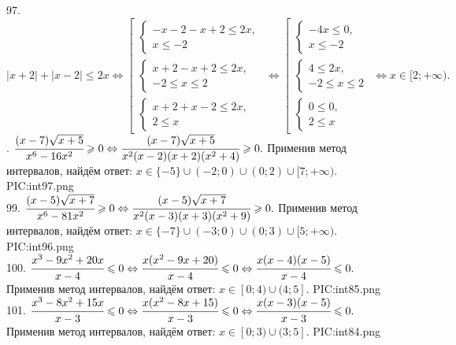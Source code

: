 97. $|x+2|+|x-2|\leqslant2x\Leftrightarrow\left[\begin{array}{l}\begin{cases}-x-2-x+2\leqslant2x,\\ x\leqslant-2\end{cases}\\
\begin{cases}x+2-x+2\leqslant2x,\\ -2\leqslant x \leqslant 2\end{cases}\\
\begin{cases}x+2+x-2\leqslant2x,\\ 2\leqslant x \end{cases}
\end{array}\right.\Leftrightarrow\left[\begin{array}{l}\begin{cases}-4x\leqslant0,\\ x\leqslant-2\end{cases}\\
\begin{cases}4\leqslant2x,\\ -2\leqslant x \leqslant 2\end{cases}\\
\begin{cases}0\leqslant0,\\ 2\leqslant x \end{cases}
\end{array}\right.\Leftrightarrow x\in[2;+\infty).$\newpage{}. $\cfrac{(x-7)\sqrt{x+5}}{x^6-16x^2}\geqslant0\Leftrightarrow
\cfrac{(x-7)\sqrt{x+5}}{x^2(x-2)(x+2)(x^2+4)}\geqslant0.$ Применив метод интервалов, найдём ответ: $x\in\{-5\}\cup(-2;0)\cup(0;2)\cup[7;+\infty).$
{{PIC:int97.png}}\\
99. $\cfrac{(x-5)\sqrt{x+7}}{x^6-81x^2}\geqslant0\Leftrightarrow
\cfrac{(x-5)\sqrt{x+7}}{x^2(x-3)(x+3)(x^2+9)}\geqslant0.$ Применив метод интервалов, найдём ответ: $x\in\{-7\}\cup(-3;0)\cup(0;3)\cup[5;+\infty).$
{{PIC:int96.png}}\\
100. $\cfrac{x^3-9x^2+20x}{x-4}\leqslant0\Leftrightarrow \cfrac{x(x^2-9x+20)}{x-4}\leqslant0\Leftrightarrow\cfrac{x(x-4)(x-5)}{x-4}\leqslant0.$ Применив метод интервалов, найдём ответ: $x\in[0;4)\cup(4;5].$
{{PIC:int85.png}}\\
101. $\cfrac{x^3-8x^2+15x}{x-3}\leqslant0\Leftrightarrow \cfrac{x(x^2-8x+15)}{x-3}\leqslant0\Leftrightarrow\cfrac{x(x-3)(x-5)}{x-3}\leqslant0.$ Применив метод интервалов, найдём ответ: $x\in[0;3)\cup(3;5].$
{{PIC:int84.png}}
\newpage
